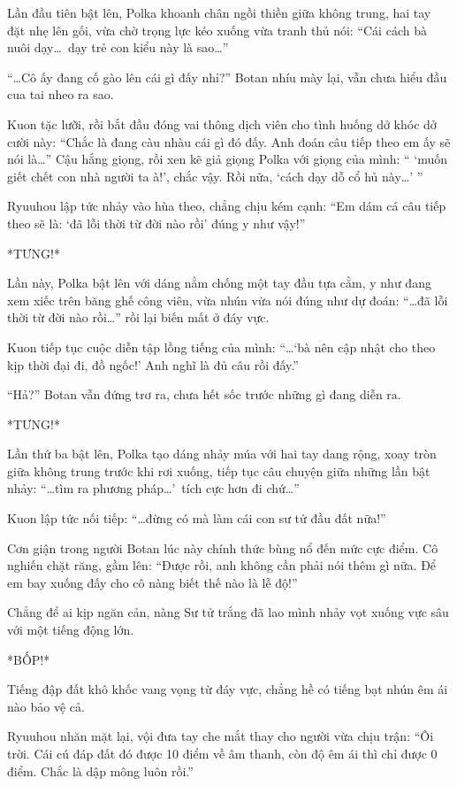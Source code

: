 \documentclass[../main.tex]{subfiles}
\begin{document}
Lần đầu tiên bật lên, Polka khoanh chân ngồi thiền giữa không trung, hai tay đặt nhẹ lên gối, vừa chờ trọng lực kéo xuống vừa tranh thủ nói: ``Cái cách bà nuôi dạy\dots\ dạy trẻ con kiểu này là sao\dots''

``\dots Cô ấy đang cố gào lên cái gì đấy nhỉ?'' Botan nhíu mày lại, vẫn chưa hiểu đầu cua tai nheo ra sao.

Kuon tặc lưỡi, rồi bắt đầu đóng vai thông dịch viên cho tình huống dở khóc dở cười này: ``Chắc là đang càu nhàu cái gì đó đấy. Anh đoán câu tiếp theo em ấy sẽ nói là\dots'' Cậu hắng giọng, rồi xen kẽ giả giọng Polka với giọng của mình: `` `muốn giết chết con nhà người ta à!', chắc vậy. Rồi nữa, `cách dạy dỗ cổ hủ này\dots' ''

Ryuuhou lập tức nhảy vào hùa theo, chẳng chịu kém cạnh: ``Em dám cá câu tiếp theo sẽ là: `đã lỗi thời từ đời nào rồi' đúng y như vậy!''

*TƯNG!*

Lần này, Polka bật lên với dáng nằm chống một tay đầu tựa cằm, y như đang xem xiếc trên băng ghế công viên, vừa nhún vừa nói đúng như dự đoán: ``\dots đã lỗi thời từ đời nào rồi\dots'' rồi lại biến mất ở đáy vực.

Kuon tiếp tục cuộc diễn tập lồng tiếng của mình: ``\dots `bà nên cập nhật cho theo kịp thời đại đi, đồ ngốc!'  Anh nghĩ là đủ câu rồi đấy.''

``Hả?'' Botan vẫn đứng trơ ra, chưa hết sốc trước những gì đang diễn ra.

*TƯNG!*

Lần thứ ba bật lên, Polka tạo dáng nhảy múa với hai tay dang rộng, xoay tròn giữa không trung trước khi rơi xuống, tiếp tục câu chuyện giữa những lần bật nhảy: ``\dots tìm ra phương pháp\dots'\ tích cực hơn đi chứ\dots''

Kuon lập tức nối tiếp: ``\dots đừng có mà làm cái con sư tử đầu đất nữa!''

Cơn giận trong người Botan lúc này chính thức bùng nổ đến mức cực điểm. Cô nghiến chặt răng, gầm lên: ``Được rồi, anh không cần phải nói thêm gì nữa. Để em bay xuống đấy cho cô nàng biết thế nào là lễ độ!''

Chẳng để ai kịp ngăn cản, nàng Sư tử trắng đã lao mình nhảy vọt xuống vực sâu với một tiếng động lớn.

*BỐP!*

Tiếng đập đất khô khốc vang vọng từ đáy vực, chẳng hề có tiếng bạt nhún êm ái nào bảo vệ cả.

Ryuuhou nhăn mặt lại, vội đưa tay che mắt thay cho người vừa chịu trận: ``Ôi trời. Cái cú đáp đất đó được 10 điểm về âm thanh, còn độ êm ái thì chỉ được 0 điểm. Chắc là dập mông luôn rồi.''
\end{document}
